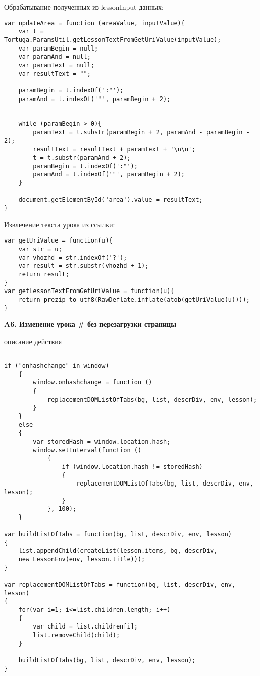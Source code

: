 Обрабатывание полученных из lessonInput  данных:
\begin{verbatim}
var updateArea = function (areaValue, inputValue){
    var t =  Tortuga.ParamsUtil.getLessonTextFromGetUriValue(inputValue);
    var paramBegin = null;
    var paramAnd = null;
    var paramText = null;
    var resultText = "";

    paramBegin = t.indexOf(':"');
    paramAnd = t.indexOf('"', paramBegin + 2);

	
    while (paramBegin > 0){
        paramText = t.substr(paramBegin + 2, paramAnd - paramBegin - 2);
        resultText = resultText + paramText + '\n\n';
        t = t.substr(paramAnd + 2);
        paramBegin = t.indexOf(':"');
        paramAnd = t.indexOf('"', paramBegin + 2);
    }

    document.getElementById('area').value = resultText;
}
\end{verbatim}

Извлечение текста урока из ссылки:

\begin{verbatim}
var getUriValue = function(u){
    var str = u;
    var vhozhd = str.indexOf('?');
    var result = str.substr(vhozhd + 1);
    return result;
}
var getLessonTextFromGetUriValue = function(u){
    return prezip_to_utf8(RawDeflate.inflate(atob(getUriValue(u))));
}
\end{verbatim}

\vspace{16mm}
\textbf{\Large A6. Изменение урока \# без перезагрузки страницы}
\vspace{6mm}

описание действия
\begin{verbatim}

if ("onhashchange" in window)
    {
        window.onhashchange = function () 
        {
            replacementDOMListOfTabs(bg, list, descrDiv, env, lesson);
        }
    }
    else
    {
        var storedHash = window.location.hash;
        window.setInterval(function () 
            {
                if (window.location.hash != storedHash) 
                {
                    replacementDOMListOfTabs(bg, list, descrDiv, env, lesson);
                }
            }, 100);
    }

var buildListOfTabs = function(bg, list, descrDiv, env, lesson)
{
    list.appendChild(createList(lesson.items, bg, descrDiv,
    new LessonEnv(env, lesson.title))); 
}

var replacementDOMListOfTabs = function(bg, list, descrDiv, env, lesson)
{
    for(var i=1; i<=list.children.length; i++) 
    {
        var child = list.children[i];
        list.removeChild(child);
    }

    buildListOfTabs(bg, list, descrDiv, env, lesson);
}

\end{verbatim}

